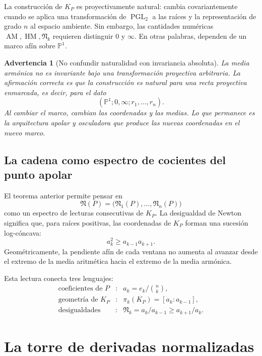 \documentclass[11pt,oneside]{scrartcl}
\theoremstyle{plainblue}
\theoremstyle{definitionblue}
\theoremstyle{remarkgray}
\newtheorem{warning}[theorem]{Advertencia}
\newcommand{\PP}{\mathbb{P}}
\newcommand{\PGL}{\operatorname{PGL}}
\newcommand{\AM}{\operatorname{AM}}
\newcommand{\HM}{\operatorname{HM}}
\newcommand{\cN}{\mathfrak{N}}
\begin{document}
La construcción de \(K_P\) es proyectivamente natural: cambia covariantemente cuando
se aplica una transformación de \(\PGL_2\) a las raíces y la representación de grado
\(n\) al espacio ambiente. Sin embargo, las cantidades numéricas
\(\AM,\HM,\cN_k\) requieren distinguir \(0\) y \(\infty\). En otras palabras, dependen
de un marco afín sobre \(\PP^1\).

\begin{warning}[No confundir naturalidad con invariancia absoluta]
La media armónica no es invariante bajo una transformación proyectiva arbitraria.
La afirmación correcta es que la construcción es natural para una recta proyectiva
\emph{enmarcada}, es decir, para el dato
\[
(\PP^1;0,\infty;r_1,\dots,r_n).
\]
Al cambiar el marco, cambian las coordenadas y las medias. Lo que permanece es la
arquitectura apolar y osculadora que produce las nuevas coordenadas en el nuevo marco.
\end{warning}

\subsection{La cadena como espectro de cocientes del punto apolar}

El teorema anterior permite pensar en
\[
\cN(P)=\bigl(\cN_1(P),\dots,\cN_n(P)\bigr)
\]
como un espectro de lecturas consecutivas de \(K_P\). La desigualdad de Newton
significa que, para raíces positivas, las coordenadas de \(K_P\) forman una sucesión
log-cóncava:
\[
a_k^2\ge a_{k-1}a_{k+1}.
\]
Geométricamente, la pendiente afín de cada ventana no aumenta al avanzar desde el
extremo de la media aritmética hacia el extremo de la media armónica.

Esta lectura conecta tres lenguajes:
\[
\begin{array}{ccl}
\text{coeficientes de }P &:& a_k=e_k/\binom nk,\\[1mm]
\text{geometría de }K_P &:& \pi_k(K_P)=[a_k:a_{k-1}],\\[1mm]
\text{desigualdades} &:& \cN_k=a_k/a_{k-1}\ge a_{k+1}/a_k.
\end{array}
\]

\section{La torre de derivadas normalizadas}
\end{document}
